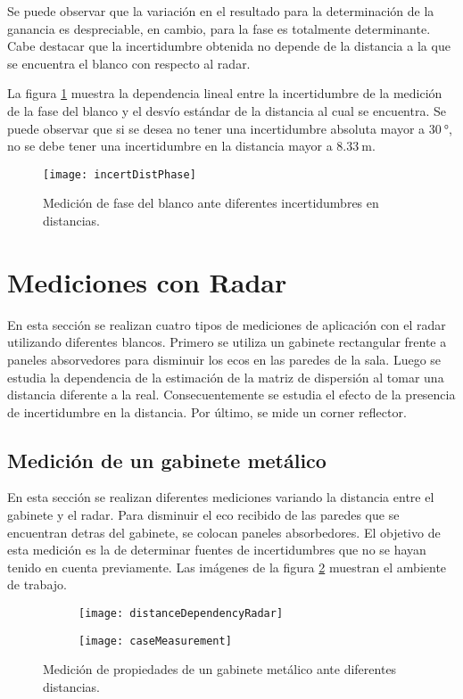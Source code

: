 Se puede observar que la variación en el resultado para la determinación de la ganancia es despreciable, en cambio, para la fase es totalmente determinante. Cabe destacar que la incertidumbre obtenida no depende de la distancia a la que se encuentra el blanco con respecto al radar.

La figura \ref{fig:incertDistSim} muestra la dependencia lineal entre la incertidumbre de la medición de la fase del blanco y el desvío estándar de la distancia al cual se encuentra. Se puede observar que si se desea no tener una incertidumbre absoluta mayor a $\SI{30}{\degree}$, no se debe tener una incertidumbre en la distancia mayor a $\SI{8.33}{\meter}$.
\begin{figure}[H]
  \centering
  \texttt{[image: incertDistPhase]}
  \caption{Medición de fase del blanco ante diferentes incertidumbres en distancias.}
  \label{fig:incertDistSim}
\end{figure}


\section{Mediciones con Radar}

En esta sección se realizan cuatro tipos de mediciones de aplicación con el radar utilizando diferentes blancos. Primero se utiliza un gabinete rectangular frente a paneles absorvedores para disminuir los ecos en las paredes de la sala. Luego se estudia la dependencia de la estimación de la matriz de dispersión al tomar una distancia diferente a la real. Consecuentemente se estudia el efecto de la presencia de incertidumbre en la distancia. Por último, se mide un corner reflector.


\subsection{Medición de un gabinete metálico}

En esta sección se realizan diferentes mediciones variando la distancia entre el gabinete y el radar. Para disminuir el eco recibido de las paredes que se encuentran detras del gabinete, se colocan paneles absorbedores. El objetivo de esta medición es la de determinar fuentes de incertidumbres que no se hayan tenido en cuenta previamente. Las imágenes de la figura \ref{fig:DistDependencySim2} muestran el ambiente de trabajo.
\begin{figure}[H]
  \centering
  \begin{subfigure}{0.59\textwidth}
    \texttt{[image: distanceDependencyRadar]}
  \end{subfigure}
  \begin{subfigure}{0.39\textwidth}
    \texttt{[image: caseMeasurement]}
  \end{subfigure}
  \caption{Medición de propiedades de un gabinete metálico ante diferentes distancias.}
  \label{fig:DistDependencySim2}
\end{figure}

